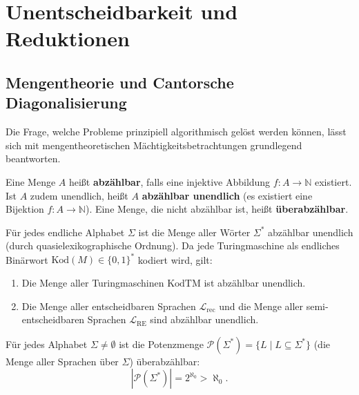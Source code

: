 \section{Unentscheidbarkeit und Reduktionen}

\subsection{Mengentheorie und Cantorsche Diagonalisierung}

Die Frage, welche Probleme prinzipiell algorithmisch gelöst werden können, lässt sich mit mengentheoretischen Mächtigkeitsbetrachtungen grundlegend beantworten.

\begin{definition}[Abzählbarkeit]
    Eine Menge $A$ heißt \textbf{abzählbar}, falls eine injektive Abbildung $f : A \to \mathbb{N}$ existiert. Ist $A$ zudem unendlich, heißt $A$ \textbf{abzählbar unendlich} (es existiert eine Bijektion $f : A \to \mathbb{N}$). Eine Menge, die nicht abzählbar ist, heißt \textbf{überabzählbar}.
\end{definition}

\begin{lemma}
    Für jedes endliche Alphabet $\Sigma$ ist die Menge aller Wörter $\Sigma^*$ abzählbar unendlich (durch quasielexikographische Ordnung). Da jede Turingmaschine als endliches Binärwort $\mathrm{Kod}(M) \in \{0, 1\}^*$ kodiert wird, gilt:
    \begin{enumerate}
        \item Die Menge aller Turingmaschinen $\mathrm{KodTM}$ ist abzählbar unendlich.
        \item Die Menge aller entscheidbaren Sprachen $\mathcal{L}_{\mathrm{rec}}$ und die Menge aller semi-entscheidbaren Sprachen $\mathcal{L}_{\mathrm{RE}}$ sind abzählbar unendlich.
    \end{enumerate}
\end{lemma}

\begin{theorem}
    Für jedes Alphabet $\Sigma \neq \emptyset$ ist die Potenzmenge $\mathcal{P}(\Sigma^*) = \{L \mid L \subseteq \Sigma^*\}$ (die Menge aller Sprachen über $\Sigma$) überabzählbar:
    \[
        |\mathcal{P}(\Sigma^*)| = 2^{\aleph_0} > \aleph_0.
    \]
\end{theorem}

